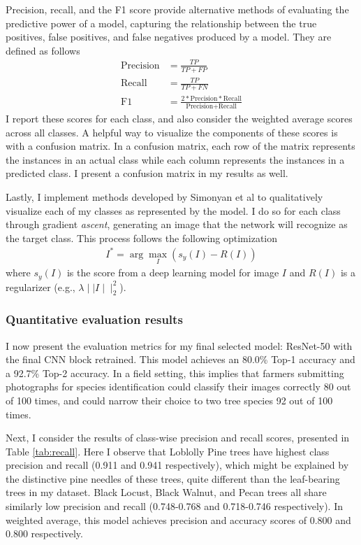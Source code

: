 \documentclass[10pt,twocolumn,letterpaper]{article}
\begin{document}
Precision, recall, and the F1 score provide alternative methods of evaluating the predictive power of a model, capturing the relationship between the true positives, false positives, and false negatives produced by a model. They are defined as follows
\begin{align*}
  \textrm{Precision} &= \frac{TP}{TP + FP}\\
  \textrm{Recall} &= \frac{TP}{TP + FN}\\
  \textrm{F1} &= \frac{2 * \textrm{Precision} * \textrm{Recall}}{\textrm{Precision} + \textrm{Recall}}
\end{align*}
I report these scores for each class, and also consider the weighted average scores across all classes. A helpful way to visualize the components of these scores is with a confusion matrix. In a confusion matrix, each row of the matrix represents the instances in an actual class while each column represents the instances in a predicted class. I present a confusion matrix in my results as well.

Lastly, I implement methods developed by Simonyan et al \cite{simonyan} to qualitatively visualize each of my classes as represented by the model. I do so for each class through gradient \textit{ascent}, generating an image that the network will recognize as the target class. This process follows the following optimization
\begin{align*}
  I^* = \arg\max_I(s_y(I) - R(I))
\end{align*}
where $s_y(I)$ is the score from a deep learning model for image $I$ and $R(I)$ is a regularizer (e.g., $\lambda \mid\mid I \mid\mid_2^2$).

\subsubsection{Quantitative evaluation results}
I now present the evaluation metrics for my final selected model: ResNet-50 with the final CNN block retrained. This model achieves an 80.0\% Top-1 accuracy and a 92.7\% Top-2 accuracy. In a field setting, this implies that farmers submitting photographs for species identification could classify their images correctly 80 out of 100 times, and could narrow their choice to two tree species 92 out of 100 times. 

Next, I consider the results of class-wise precision and recall scores, presented in Table \ref{tab:recall}. Here I observe that Loblolly Pine trees have highest class precision and recall (0.911 and 0.941 respectively), which might be explained by the distinctive pine needles of these trees, quite different than the leaf-bearing trees in my dataset. Black Locust, Black Walnut, and Pecan trees all share similarly low precision and recall (0.748-0.768 and 0.718-0.746 respectively). In weighted average, this model achieves precision and accuracy scores of 0.800 and 0.800 respectively.
\end{document}
